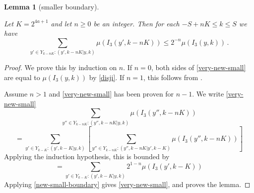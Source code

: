 \documentclass[10pt,a4paper]{article}
\theoremstyle{plain}
\newtheorem{lemma}[theorem]{Lemma}
\theoremstyle{definition}
\numberwithin{equation}{subsection}
\newcommand{\lean}[1]{}
\newcommand{\uses}[1]{}
\newcommand{\leanok}{}
\begin{document}
\begin{lemma}[smaller boundary]
    \label{smaller-boundary}
    \uses{small-boundary}
    \leanok
    \lean{smaller_boundary}
    Let $K = 2^{4a+1}$
    and let $n\ge 0$ be an integer. Then
    for each $-S+nK\le k\le S$ we have
    \begin{equation}
            \label{very-new-small}
            \sum_{y'\in Y_{k-nK}: (y',k-nK|y,k)}\mu(I_3(y',k-nK)) \le 2^{-n} \mu(I_3(y,k))\,.
        \end{equation}
\end{lemma}
\begin{proof}
    \leanok
    We prove this by induction on $n$. If $n=0$,
    both sides of \eqref{very-new-small} are equal to
    $\mu(I_3(y,k))$ by \eqref{disji}. If $n=1$, this follows from .

    Assume $n>1$ and \eqref{very-new-small} has been proven for $n-1$.
    We write \eqref{very-new-small}
    \begin{equation}
        \sum_{y''\in Y_{k-nK}: (y'',k-nK|y,k)}\mu(I_3(y'',k-nK))
    \end{equation}
    \begin{equation}
        = \sum_{y'\in Y_{k-K}:(y',k-K|y,k)} \left[ \sum_{y''\in Y_{k-nK}: (y'',k-nK|y',k-K)}\mu(I_3(y'',k-nK)) \right]
    \end{equation}
    Applying the induction hypothesis, this is bounded by
    \begin{equation}
        = \sum_{y'\in Y_{k-K}:(y',k-K|y,k)} 2^{1-n}\mu(I_3(y',k-K))
    \end{equation}
    Applying \eqref{new-small-boundary} gives
    \eqref{very-new-small}, and proves the lemma.
\end{proof}
\end{document}

